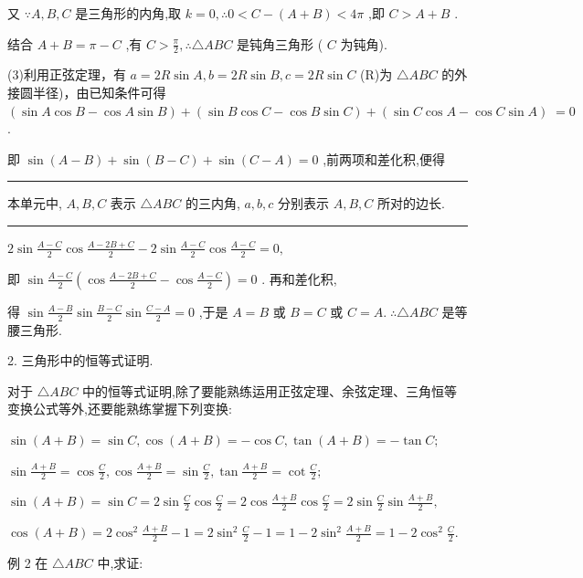 \documentclass[10pt]{article}
\newcommand{\HRule}{\begin{center}\rule{0.9\linewidth}{0.2mm}\end{center}}
\newcommand*\circled[1]{\tikz[baseline=(char.base)]{\node[shape=circle,draw,inner sep=1.5pt] (char) {\small #1};}}
\begin{document}
又 \(\because A,B,C\) 是三角形的内角,取 \(k = 0,\therefore 0 < C - \left( {A + B}\right)  < {4\pi }\) ,即 \(C > A + B\) .

结合 \(A + B = \pi  - C\) ,有 \(C > \frac{\pi }{2},\therefore \bigtriangleup {ABC}\) 是钝角三角形 ( \(C\) 为钝角).

(3)利用正弦定理，有 \(a = {2R}\sin A,b = {2R}\sin B,c = {2R}\sin C\) (R)为 \(\bigtriangleup  {ABC}\) 的外接圆半径)，由已知条件可得 \(\left( {\sin A\cos B - \cos A\sin B}\right)  + \left( {\sin B\cos C - \cos B\sin C}\right)  + \left( {\sin C\cos A - \cos C\sin A}\right) \; = 0\) .

即 \(\sin \left( {A - B}\right)  + \sin \left( {B - C}\right)  + \sin \left( {C - A}\right)  = 0\) ,前两项和差化积,便得

\HRule

 \circled{1}  本单元中, \(A,B,C\) 表示 \(\bigtriangleup {ABC}\) 的三内角, \(a,b,c\) 分别表示 \(A,B,C\) 所对的边长.

\HRule

\(2\sin \frac{A - C}{2}\cos \frac{A - {2B} + C}{2} - 2\sin \frac{A - C}{2}\cos \frac{A - C}{2} = 0,\)

即 \(\sin \frac{A - C}{2}\left( {\cos \frac{A - {2B} + C}{2} - \cos \frac{A - C}{2}}\right)  = 0\) . 再和差化积,

得 \(\sin \frac{A - B}{2}\sin \frac{B - C}{2}\sin \frac{C - A}{2} = 0\) ,于是 \(A = B\) 或 \(B = C\) 或 \(C = A.\;\therefore \bigtriangleup {ABC}\) 是等腰三角形.

2. 三角形中的恒等式证明.

对于 \(\bigtriangleup {ABC}\) 中的恒等式证明,除了要能熟练运用正弦定理、余弦定理、三角恒等变换公式等外,还要能熟练掌握下列变换:

\(\sin \left( {A + B}\right)  = \sin C,\cos \left( {A + B}\right)  =  - \cos C,\tan \left( {A + B}\right)  =  - \tan C;\)

\(\sin \frac{A + B}{2} = \cos \frac{C}{2},\cos \frac{A + B}{2} = \sin \frac{C}{2},\tan \frac{A + B}{2} = \cot \frac{C}{2};\)

\(\sin \left( {A + B}\right)  = \sin C = 2\sin \frac{C}{2}\cos \frac{C}{2} = 2\cos \frac{A + B}{2}\cos \frac{C}{2} = 2\sin \frac{C}{2}\sin \frac{A + B}{2},\)

\(\cos \left( {A + B}\right)  = 2{\cos }^{2}\frac{A + B}{2} - 1 = 2{\sin }^{2}\frac{C}{2} - 1 = 1 - 2{\sin }^{2}\frac{A + B}{2} = 1 - 2{\cos }^{2}\frac{C}{2}.\)

例 2 在 \(\bigtriangleup {ABC}\) 中,求证:
\end{document}
